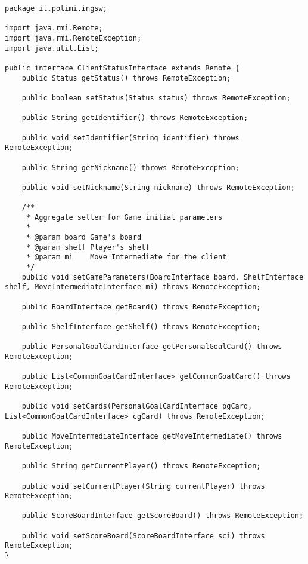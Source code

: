 \documentclass[a4paper,11pt]{article} %
\begin{document}
    \begin{verbatim}
package it.polimi.ingsw;

import java.rmi.Remote;
import java.rmi.RemoteException;
import java.util.List;

public interface ClientStatusInterface extends Remote {
    public Status getStatus() throws RemoteException;

    public boolean setStatus(Status status) throws RemoteException;

    public String getIdentifier() throws RemoteException;

    public void setIdentifier(String identifier) throws RemoteException;

    public String getNickname() throws RemoteException;

    public void setNickname(String nickname) throws RemoteException;

    /**
     * Aggregate setter for Game initial parameters
     *
     * @param board Game's board
     * @param shelf Player's shelf
     * @param mi    Move Intermediate for the client
     */
    public void setGameParameters(BoardInterface board, ShelfInterface shelf, MoveIntermediateInterface mi) throws RemoteException;

    public BoardInterface getBoard() throws RemoteException;

    public ShelfInterface getShelf() throws RemoteException;

    public PersonalGoalCardInterface getPersonalGoalCard() throws RemoteException;

    public List<CommonGoalCardInterface> getCommonGoalCard() throws RemoteException;

    public void setCards(PersonalGoalCardInterface pgCard, List<CommonGoalCardInterface> cgCard) throws RemoteException;

    public MoveIntermediateInterface getMoveIntermediate() throws RemoteException;

    public String getCurrentPlayer() throws RemoteException;

    public void setCurrentPlayer(String currentPlayer) throws RemoteException;

    public ScoreBoardInterface getScoreBoard() throws RemoteException;

    public void setScoreBoard(ScoreBoardInterface sci) throws RemoteException;
}
    \end{verbatim}

    \newpage
\end{document}
